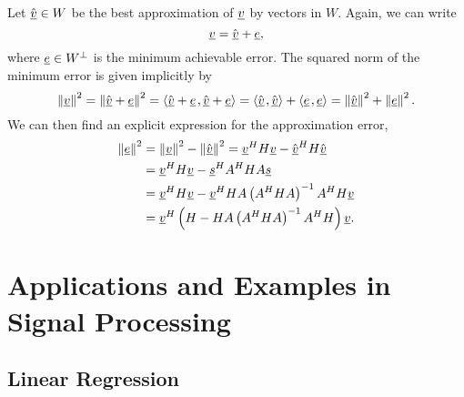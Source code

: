 Let $\hat{\underline{v}} \in W$ be the best approximation of $\underline{v}$ by vectors in $W$.
Again, we can write
\begin{equation*}
\underline{v} = \hat{\underline{v}} + \underline{e},
\end{equation*}
where $\underline{e} \in W^{\bot}$ is the minimum achievable error.
The squared norm of the minimum error is given implicitly by
\begin{equation*}
\left\| \underline{v} \right\|^2
= \left\| \hat{\underline{v}} + \underline{e} \right\|^2
= {\left\langle  \hat{\underline{v}} + \underline{e}  \mskip2mu ,  \hat{\underline{v}} + \underline{e}  \right\rangle}
= {\left\langle  \hat{\underline{v}}  \mskip2mu ,  \hat{\underline{v}}  \right\rangle}
+ {\left\langle  \underline{e}  \mskip2mu ,  \underline{e}  \right\rangle}
= \left\| \hat{\underline{v}} \right\|^2 + \left\| \underline{e} \right\|^2 .
\end{equation*}
We can then find an explicit expression for the approximation error,
\begin{equation*}
\begin{split}
\left\| \underline{e} \right\|^2
&= \left\| \underline{v} \right\|^2
- \left\| \hat{\underline{v}} \right\|^2
= \underline{v}^H H \underline{v} - \hat{\underline{v}}^H H \hat{\underline{v}} \\
&= \underline{v}^H H \underline{v} - \underline{s}^H A^H H A \underline{s} \\
&= \underline{v}^H H \underline{v}
- \underline{v}^H H A \left( A^H H A \right)^{-1} A^H H \underline{v} \\
&= \underline{v}^H
\left( H -  H A \left( A^H H A \right)^{-1} A^H H \right)
\underline{v}.
\end{split}
\end{equation*}


\section{Applications and Examples in Signal Processing}

\subsection{Linear Regression}

